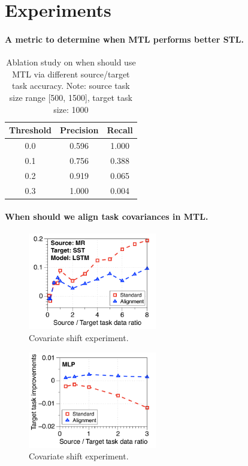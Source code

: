 \section{Experiments}

\paragraph{A metric to determine when MTL performs better STL.}
\begin{table}
\begin{center}
  \begin{tabular}{c c c}
  \toprule
    {\bf Threshold}  & {\bf Precision} &  {\bf Recall} \\
    \midrule
    0.0 & 0.596 & 1.000 \\
    0.1 & 0.756 & 0.388 \\
    0.2 & 0.919 & 0.065 \\
    0.3 & 1.000 & 0.004 \\	
  \bottomrule
  \end{tabular}
\end{center}
\caption{Ablation study on when should use MTL via different source/target task accuracy. Note: source task size range [500, 1500], target task size: 1000}
\label{tab:mtl_better_than_stl}
\end{table}


\paragraph{When should we align task covariances in MTL.}
\begin{figure}
	\centering
	\includegraphics[width=0.5\textwidth]{figures/ratio_alignment_mr_sst_lstm.pdf}
	\caption{Covariate shift experiment.}
\end{figure}

\begin{figure}
	\centering
	\includegraphics[width=0.5\textwidth]{figures/ratio_alignment_mlp.pdf}
	\caption{Covariate shift experiment.}
\end{figure}
